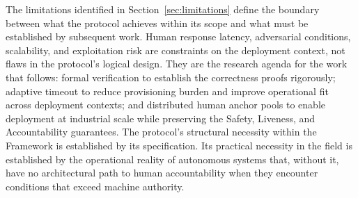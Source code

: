 The limitations identified in Section~\ref{sec:limitations} define the boundary between what the protocol achieves within its scope and what must be established by subsequent work. Human response latency, adversarial conditions, scalability, and exploitation risk are constraints on the deployment context, not flaws in the protocol's logical design. They are the research agenda for the work that follows: formal verification to establish the correctness proofs rigorously; adaptive timeout to reduce provisioning burden and improve operational fit across deployment contexts; and distributed human anchor pools to enable deployment at industrial scale while preserving the Safety, Liveness, and Accountability guarantees. The protocol's structural necessity within the \bxthree{} Framework is established by its specification. Its practical necessity in the field is established by the operational reality of autonomous systems that, without it, have no architectural path to human accountability when they encounter conditions that exceed machine authority.
